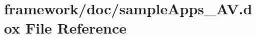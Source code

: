 \hypertarget{sample_apps___a_v_8dox}{}\section{framework/doc/sample\+Apps\+\_\+\+AV.dox File Reference}
\label{sample_apps___a_v_8dox}
